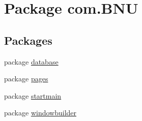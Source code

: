 \hypertarget{namespacecom_1_1_b_n_u}{}\section{Package com.\+B\+NU}
\label{namespacecom_1_1_b_n_u}
\subsection*{Packages}
\begin{DoxyCompactItemize}
\item 
package \mbox{\hyperlink{namespacecom_1_1_b_n_u_1_1database}{database}}
\item 
package \mbox{\hyperlink{namespacecom_1_1_b_n_u_1_1pages}{pages}}
\item 
package \mbox{\hyperlink{namespacecom_1_1_b_n_u_1_1startmain}{startmain}}
\item 
package \mbox{\hyperlink{namespacecom_1_1_b_n_u_1_1windowbuilder}{windowbuilder}}
\end{DoxyCompactItemize}
